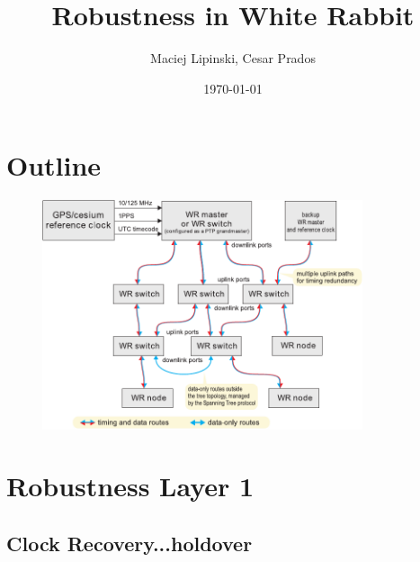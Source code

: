 \documentclass[]{beamer}
\title{Robustness in White Rabbit}    %
\author{Maciej Lipinski, Cesar Prados}                 %
\institute{CERN \&  GSI}      %
\date{\today}                    %
\begin{document}
\begin{frame}
\end{frame}

\section*{Outline}
\begin{frame}
  \tableofcontents
\end{frame}

\begin{frame}
\begin{figure}[tbp] %
  \centering
  \includegraphics[height=2.65in,keepaspectratio]{network/hierarchy.pdf}
  \label{fig:hierarchy}
\end{figure}

\end{frame}

\section{Robustness Layer 1}

\subsection{Clock Recovery...holdover}
\end{document}
